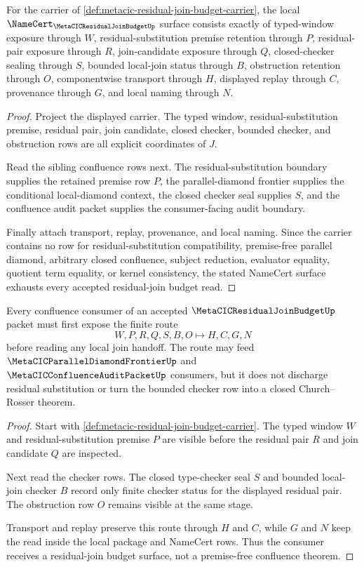 \begin{theorem}
\label{thm:metacic-residual-join-budget-namecert-obligations}
For the carrier of \autoref{def:metacic-residual-join-budget-carrier}, the local $\NameCert_{\MetaCICResidualJoinBudgetUp}$ surface consists exactly of typed-window exposure through $W$, residual-substitution premise retention through $P$, residual-pair exposure through $R$, join-candidate exposure through $Q$, closed-checker sealing through $S$, bounded local-join status through $B$, obstruction retention through $O$, componentwise transport through $H$, displayed replay through $C$, provenance through $G$, and local naming through $N$.
\end{theorem}
\begin{proof}
Project the displayed carrier. The typed window, residual-substitution premise, residual pair, join candidate, closed checker, bounded checker, and obstruction rows are all explicit coordinates of $J$.

Read the sibling confluence rows next. The residual-substitution boundary supplies the retained premise row $P$, the parallel-diamond frontier supplies the conditional local-diamond context, the closed checker seal supplies $S$, and the confluence audit packet supplies the consumer-facing audit boundary.

Finally attach transport, replay, provenance, and local naming. Since the carrier contains no row for residual-substitution compatibility, premise-free parallel diamond, arbitrary closed confluence, subject reduction, evaluator equality, quotient term equality, or kernel consistency, the stated NameCert surface exhausts every accepted residual-join budget read.
\end{proof}

\begin{theorem}
\label{thm:metacic-residual-join-budget-confluence-route}
Every confluence consumer of an accepted $\MetaCICResidualJoinBudgetUp$ packet must first expose the finite route
$$
W,P,R,Q,S,B,O \longmapsto H,C,G,N
$$
before reading any local join handoff. The route may feed $\MetaCICParallelDiamondFrontierUp$ and $\MetaCICConfluenceAuditPacketUp$ consumers, but it does not discharge residual substitution or turn the bounded checker row into a closed Church--Rosser theorem.
\end{theorem}
\begin{proof}
Start with \autoref{def:metacic-residual-join-budget-carrier}. The typed window $W$ and residual-substitution premise $P$ are visible before the residual pair $R$ and join candidate $Q$ are inspected.

Next read the checker rows. The closed type-checker seal $S$ and bounded local-join checker $B$ record only finite checker status for the displayed residual pair. The obstruction row $O$ remains visible at the same stage.

Transport and replay preserve this route through $H$ and $C$, while $G$ and $N$ keep the read inside the local package and NameCert rows. Thus the consumer receives a residual-join budget surface, not a premise-free confluence theorem.
\end{proof}

